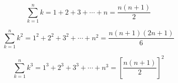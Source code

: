 $$\sum_{k=1}^{n} k = 1 + 2 + 3 + \cdots + n = \frac{n(n+1)}{2}$$

$$\sum_{k=1}^{n} k^2 = 1^2 + 2^2 + 3^2 + \cdots + n^2 = \frac{n(n+1)(2n+1)}{6}$$

$$\sum_{k=1}^{n} k^3 = 1^3 + 2^3 + 3^3 + \cdots + n^3 = \left[\frac{n(n+1)}{2}\right]^2$$

